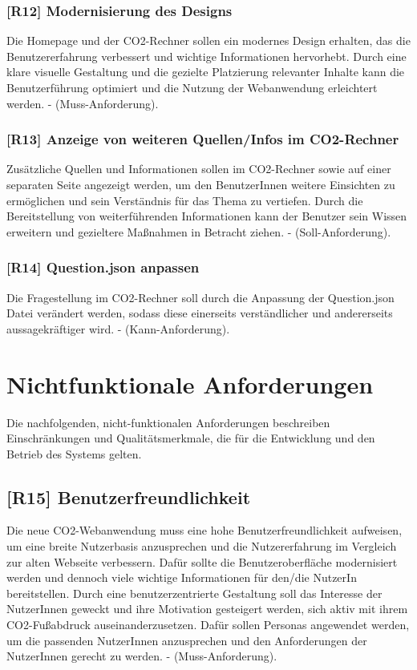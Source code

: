 \subsubsection{[R12] Modernisierung des Designs}

Die Homepage und der CO2-Rechner sollen ein modernes Design erhalten, das die Benutzererfahrung verbessert und wichtige Informationen hervorhebt. Durch eine klare visuelle Gestaltung und die gezielte Platzierung relevanter Inhalte kann die Benutzerführung optimiert und die Nutzung der Webanwendung erleichtert werden. - (Muss-Anforderung).

\subsubsection{[R13] Anzeige von weiteren Quellen/Infos im CO2-Rechner}

Zusätzliche Quellen und Informationen sollen im CO2-Rechner sowie auf einer separaten Seite angezeigt werden, um den BenutzerInnen weitere Einsichten zu ermöglichen und sein Verständnis für das Thema zu vertiefen.
Durch die Bereitstellung von weiterführenden Informationen kann der Benutzer sein Wissen erweitern und gezieltere Maßnahmen in Betracht ziehen.
- (Soll-Anforderung).

\subsubsection{[R14] Question.json anpassen}
\label{sec:questions-json-anpassen}

Die Fragestellung im CO2-Rechner soll durch die Anpassung der Question.json Datei verändert werden, sodass diese einerseits verständlicher und andererseits aussagekräftiger wird. - (Kann-Anforderung).

\section{Nichtfunktionale Anforderungen}
\label{chapter:3-section:nichtfunktionale-anforderungen}

Die nachfolgenden, nicht-funktionalen Anforderungen beschreiben Einschränkungen und Qualitätsmerkmale, die für die Entwicklung und den Betrieb des Systems gelten.

\subsection{[R15] Benutzerfreundlichkeit}

Die neue CO2-Webanwendung muss eine hohe Benutzerfreundlichkeit aufweisen, um eine breite Nutzerbasis anzusprechen und die Nutzererfahrung im Vergleich zur alten Webseite verbessern.
Dafür sollte die Benutzeroberfläche modernisiert werden und dennoch viele wichtige Informationen für den/die NutzerIn bereitstellen.
Durch eine benutzerzentrierte Gestaltung soll das Interesse der NutzerInnen geweckt und ihre Motivation gesteigert werden, sich aktiv mit ihrem CO2-Fußabdruck auseinanderzusetzen.
Dafür sollen Personas angewendet werden, um die passenden NutzerInnen anzusprechen und den Anforderungen der NutzerInnen gerecht zu werden.
- (Muss-Anforderung).

